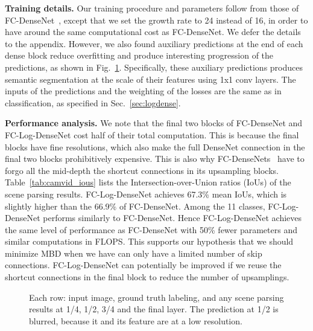 \documentclass{article}
\newcommand{\logdense}{Log-DenseNet\xspace}
\newcommand{\pbd}{MBD\xspace}
\begin{document}
\textbf{Training details.} Our training procedure and parameters follow  from those of FC-DenseNet~\citep{fcdense}, except that we set the growth rate to 24 instead of 16, in order to have around the same computational cost as FC-DenseNet. 
We defer the details to the appendix. However, we also found auxiliary predictions at the end of each dense block reduce overfitting and produce interesting progression of the predictions, as shown in Fig.~\ref{fig:scene_parsing}. Specifically, these auxiliary predictions produces semantic segmentation at the scale of their features using 1x1 conv layers. The inputs of the predictions and the weighting of the losses are the same as in classification, as specified in Sec.~\ref{sec:logdense}.


\textbf{Performance analysis.}
We note that the final two blocks of FC-DenseNet and FC-\logdense cost half of their total computation. This is because the final blocks have fine resolutions, which also make the full DenseNet connection in the final two blocks prohibitively expensive. This is also why FC-DenseNets~\citep{fcdense} have to forgo all the mid-depth the shortcut connections in its upsampling blocks. 
Table~\ref{tab:camvid_ious} lists the Intersection-over-Union ratios (IoUs) of the scene parsing results.
FC-\logdense achieves 67.3\% mean IoUs, which is slightly higher than the 66.9\% of FC-DenseNet. Among the 11 classes, FC-\logdense performs similarly to FC-DenseNet. Hence FC-\logdense achieves the same level of performance as FC-DenseNet with 50\% fewer parameters and similar computations in FLOPS. This supports our hypothesis that we should minimize \pbd when we have can only have a limited number of skip connections. FC-\logdense can potentially be improved if we reuse the shortcut connections in the final block to reduce the number of upsamplings.

\begin{figure}
    \centering
    
    
    


    \caption{Each row: input image, ground truth labeling, and any scene parsing results at 1/4, 1/2, 3/4 and the final layer. The prediction at 1/2 is blurred, because it and its feature are at a low resolution.}
    \label{fig:scene_parsing}
    \vspace{-5pt}
\end{figure}
\end{document}
